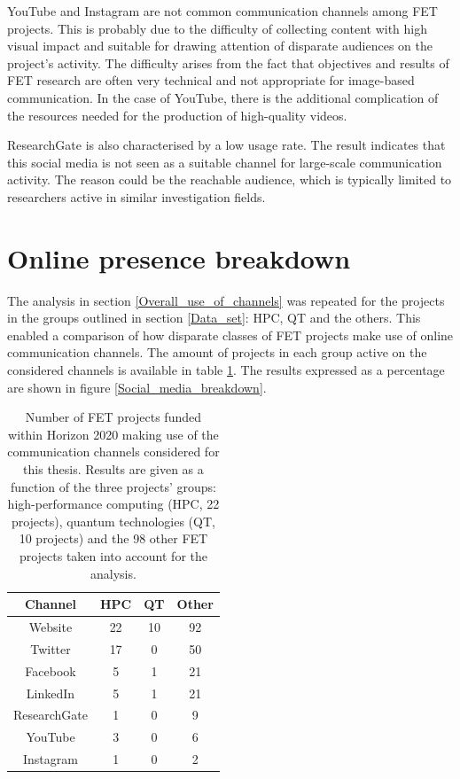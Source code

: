 YouTube and Instagram are not common communication channels among FET projects. This is probably due to the difficulty of collecting content with high visual impact and suitable for drawing attention of disparate audiences on the project's activity. The difficulty arises from the fact that objectives and results of FET research are often very technical and not appropriate for image-based communication. In the case of YouTube, there is the additional complication of the resources needed for the production of high-quality videos.

ResearchGate is also characterised by a low usage rate. The result indicates that this social media is not seen as a suitable channel for large-scale communication activity. The reason could be the reachable audience, which is typically limited to researchers active in similar investigation fields.

\section{Online presence breakdown} \label{Online_presence_breakdown}
The analysis in section \ref{Overall_use_of_channels} was repeated for the projects in the groups outlined in section \ref{Data_set}: HPC, QT and the others. This enabled a comparison of how disparate classes of FET projects make use of online communication channels. The amount of projects in each group active on the considered channels is available in table \ref{Social_media_breakdown_table}. The results expressed as a percentage are shown in figure \ref{Social_media_breakdown}. 

\begin{table}[t]
 \begin{center}
 {\footnotesize
  \begin{tabular}{cccc}
   \hline 
   \hline
   Channel & HPC & QT & Other \\ 
   \hline
   \hline
   Website & 22 & 10 & 92 \\
   Twitter & 17 & 0 & 50 \\
   Facebook & 5 & 1 & 21 \\
   LinkedIn & 5 & 1 & 21 \\
   ResearchGate & 1 & 0 & 9 \\
   YouTube & 3 & 0 & 6 \\
   Instagram & 1 & 0 & 2 \\
   \hline
   \hline
  \end{tabular}
 }
 \end{center} 
 \caption{Number of FET projects funded within Horizon 2020 making use of the communication channels considered for this thesis. Results are given as a function of the three projects' groups: high-performance computing (HPC, 22 projects), quantum technologies (QT, 10 projects) and the 98 other FET projects taken into account for the analysis.}
\label{Social_media_breakdown_table} 
\end{table}


